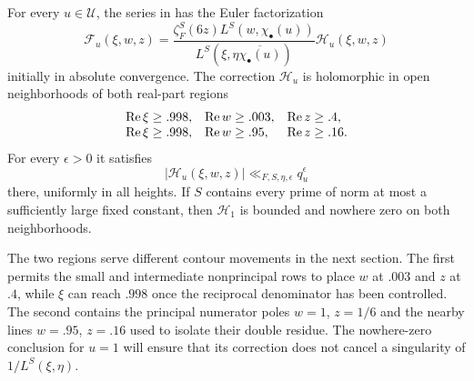 \begin{proposition}\label{prop:euler-product}
For every \(u\in\mathcal U\), the series in
 has the Euler factorization
\begin{equation}
 \mathcal F_u(\xi,w,z)=
 \frac{\zeta_F^S(6z)L^S(w,\chi_\bullet(u))}
      {L^S(\xi,\eta\overline{\chi_\bullet(u)})}
             \mathcal H_u(\xi,w,z)
\label{eq:probe-euler-product}
\end{equation}
initially in absolute convergence.  The correction \(\mathcal H_u\) is
holomorphic in open neighborhoods of both real-part regions
\begin{equation}
 \begin{array}{lll}
 \operatorname{Re}\xi\ge .998,&\operatorname{Re} w\ge .003,&\operatorname{Re} z\ge .4,\\
 \operatorname{Re}\xi\ge .998,&\operatorname{Re} w\ge .95,&\operatorname{Re} z\ge .16.
 \end{array}
\label{eq:euler-regions}
\end{equation}
For every \(\epsilon>0\) it satisfies
\[
 |\mathcal H_u(\xi,w,z)|\ll_{F,S,\eta,\epsilon}q_u^\epsilon
\]
there, uniformly in all heights.  If \(S\) contains every prime of norm
at most a sufficiently large fixed constant, then
\(\mathcal H_1\) is bounded and nowhere zero on both neighborhoods.
\end{proposition}

The two regions serve different contour movements in the next section.
The first permits the small and intermediate nonprincipal rows to place
\(w\) at \(.003\) and \(z\) at \(.4\), while \(\xi\) can reach \(.998\)
once the reciprocal denominator has been controlled.  The second contains
the principal numerator poles \(w=1\), \(z=1/6\) and the nearby lines
\(w=.95\), \(z=.16\) used to isolate their double residue.  The
nowhere-zero conclusion for \(u=1\) will ensure that its correction does
not cancel a singularity of \(1/L^S(\xi,\eta)\).

